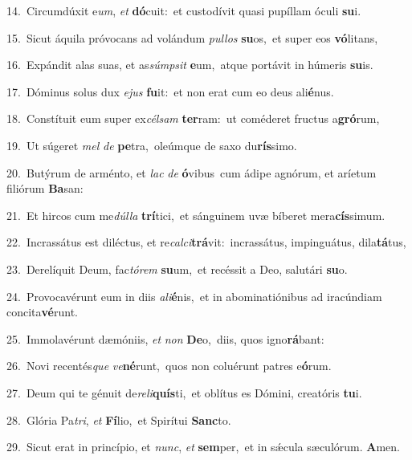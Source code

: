 {\numbfont\textcolor{\numbcolor}{14.}}~Circumdúxit e\-\textit{um}\-, \textit{et} \textbf{dó}\-cuit:~\star et custodívit quasi pupíllam óculi \textbf{su}\-i.\par
{\numbfont\textcolor{\numbcolor}{15.}}~Sicut áquila próvocans ad volándum \textit{pul}\-\textit{los} \textbf{su}\-os,~\star et super eos \textbf{vó}\-litans,\par
{\numbfont\textcolor{\numbcolor}{16.}}~Expándit alas suas, et as\-\textit{súmp}\-\textit{sit} \textbf{e}\-um,~\star atque portávit in húmeris \textbf{su}\-is.\par
{\numbfont\textcolor{\numbcolor}{17.}}~Dóminus solus dux \textit{e}\-\textit{jus} \textbf{fu}\-it:~\star et non erat cum eo deus ali\-\textbf{é}\-nus.\par
{\numbfont\textcolor{\numbcolor}{18.}}~Constítuit eum super ex\-\textit{cél}\-\textit{sam} \textbf{ter}\-ram:~\star ut coméderet fructus a\-\textbf{gró}\-rum,\par
{\numbfont\textcolor{\numbcolor}{19.}}~Ut súgeret \textit{mel} \textit{de} \textbf{pe}\-tra,~\star oleúmque de saxo du\-\textbf{rís}\-simo.\par
{\numbfont\textcolor{\numbcolor}{20.}}~Butýrum de arménto, et \textit{lac} \textit{de} \textbf{ó}\-vibus~\star cum ádipe agnórum, et aríetum filiórum \textbf{Ba}\-san:\par
{\numbfont\textcolor{\numbcolor}{21.}}~Et hircos cum me\-\textit{dúl}\-\textit{la} \textbf{trí}\-tici,~\star et sánguinem uvæ bíberet mera\-\textbf{cís}\-simum.\par
{\numbfont\textcolor{\numbcolor}{22.}}~Incrassátus est diléctus, et re\-\textit{cal}\-\textit{ci}\textbf{trá}vit:~\star incrassátus, impinguátus, dila\-\textbf{tá}\-tus,\par
{\numbfont\textcolor{\numbcolor}{23.}}~Derelíquit Deum, fac\-\textit{tó}\-\textit{rem} \textbf{su}\-um,~\star et recéssit a Deo, salutári \textbf{su}\-o.\par
{\numbfont\textcolor{\numbcolor}{24.}}~Provocavérunt eum in diis \textit{a}\-\textit{li}\textbf{é}nis,~\star et in abominatiónibus ad iracúndiam concita\-\textbf{vé}\-runt.\par
{\numbfont\textcolor{\numbcolor}{25.}}~Immolavérunt dæmóniis, \textit{et} \textit{non} \textbf{De}\-o,~\star diis, quos igno\-\textbf{rá}\-bant:\par
{\numbfont\textcolor{\numbcolor}{26.}}~Novi recentés\textit{que} \textit{ve}\-\textbf{né}runt,~\star quos non coluérunt patres e\-\textbf{ó}\-rum.\par
{\numbfont\textcolor{\numbcolor}{27.}}~Deum qui te génuit de\-\textit{re}\-\textit{li}\textbf{quís}ti,~\star et oblítus es Dómini, creatóris \textbf{tu}\-i.\par
{\numbfont\textcolor{\numbcolor}{28.}}~Glória Pa\-\textit{tri}\-, \textit{et} \textbf{Fí}\-lio,~\star et Spirítui \textbf{Sanc}\-to.\par
{\numbfont\textcolor{\numbcolor}{29.}}~Sicut erat in princípio, et \textit{nunc}\-, \textit{et} \textbf{sem}\-per,~\star et in sǽcula sæculórum. \textbf{A}\-men.\par
